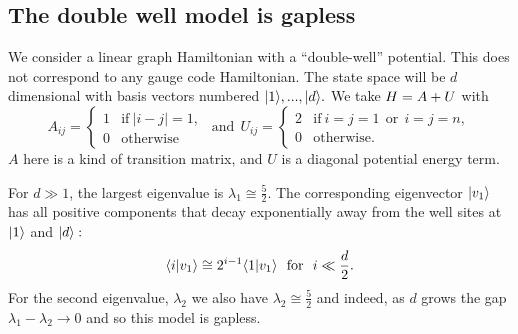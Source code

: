 \documentclass[12pt]{article}
\begin{document}
\subsection{The double well model is gapless}

We consider a linear graph Hamiltonian
with a ``double-well'' potential.
This does not correspond to any gauge code Hamiltonian.
The state space will be $d$ dimensional with
basis vectors numbered $|{1}\rangle,...,|{d}\rangle.$
We take
$ H = A + U $
with
$$
A_{ij} = \left\{ \begin{array}{ll}
     1 &\mbox{if}\  |i-j|=1,  \\
     0 &\mbox{otherwise}\end{array}\right.
\ \ \mbox{and}\ \ 
U_{ij} =  \left\{ \begin{array}{ll}
     2 &\mbox{if}\  i=j=1 \ \ \mbox{or}\ \  i=j=n, \\
     0 &\mbox{otherwise.}\end{array}\right.
$$
$A$ here is a kind of transition matrix,
and $U$ is a diagonal potential energy term.

For $d\gg 1$, the largest
eigenvalue is $\lambda_1 \cong \frac{5}{2}$.
The corresponding eigenvector $|{v_1}\rangle$
has all positive components that
decay exponentially away from the well sites
at $|{1}\rangle$ and $|{d}\rangle:$
$$
    \langle{i}|{v_1}\rangle 
    \cong 2^{i-1} \langle{1}|{v_1}\rangle
    \ \ \mbox{for}\ \ i\ll \frac{d}{2}.
$$
For the second eigenvalue, $\lambda_2$
we also have  $\lambda_2 \cong \frac{5}{2}$
and indeed, as $d$ grows
the gap $\lambda_1 - \lambda_2 \rightarrow 0$
and so this model is gapless.
\end{document}
